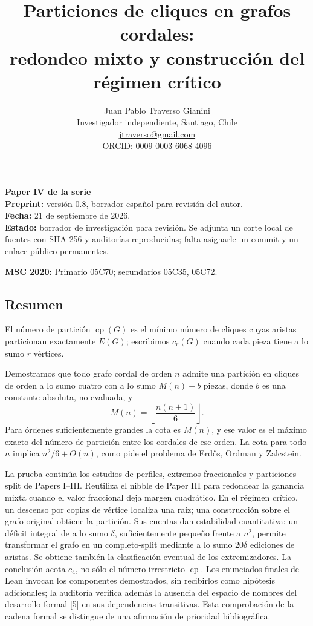 \documentclass[spanish,11pt,a4paper]{article}
\title{Particiones de cliques en grafos cordales:\\redondeo mixto y construcción del régimen crítico}
\author{Juan Pablo Traverso Gianini\\
\small Investigador independiente, Santiago, Chile\\
\small \href{mailto:jtraverso@gmail.com}{jtraverso@gmail.com}\\
\small ORCID: 0009-0003-6068-4096}
\date{}
\begin{document}
\raggedbottom
\maketitle
\textbf{Paper IV de la serie}\\
\textbf{Preprint:} versión 0.8, borrador español para revisión del autor.\\
\textbf{Fecha:} 21 de septiembre de 2026.\\
\textbf{Estado:} borrador de investigación para revisión. Se adjunta un corte local de fuentes con SHA-256 y auditorías reproducidas; falta asignarle un commit y un enlace público permanentes.

\textbf{MSC 2020:} Primario 05C70; secundarios 05C35, 05C72.

\subsection{Resumen}\label{resumen}

El número de partición \(\operatorname{cp}(G)\) es el mínimo número de cliques cuyas aristas particionan exactamente \(E(G)\); escribimos \(c_r(G)\) cuando cada pieza tiene a lo sumo \(r\) vértices.

Demostramos que todo grafo cordal de orden \(n\) admite una partición en cliques de orden a lo sumo cuatro con a lo sumo \(M(n)+b\) piezas, donde \(b\) es una constante absoluta, no evaluada, y \[
M(n)=\left\lfloor\frac{n(n+1)}6\right\rfloor.
\] Para órdenes suficientemente grandes la cota es \(M(n)\), y ese valor es el máximo exacto del número de partición entre los cordales de ese orden. La cota para todo \(n\) implica \(n^2/6+O(n)\), como pide el problema de Erdős, Ordman y Zalcstein.

La prueba continúa los estudios de perfiles, extremos fraccionales y particiones split de Papers I--III. Reutiliza el nibble de Paper III para redondear la ganancia mixta cuando el valor fraccional deja margen cuadrático. En el régimen crítico, un descenso por copias de vértice localiza una raíz; una construcción sobre el grafo original obtiene la partición. Sus cuentas dan estabilidad cuantitativa: un déficit integral de a lo sumo \(\delta\), suficientemente pequeño frente a \(n^2\), permite transformar el grafo en un completo-split mediante a lo sumo \(20\delta\) ediciones de aristas. Se obtiene también la clasificación eventual de los extremizadores. La conclusión acota \(c_4\), no sólo el número irrestricto \(\operatorname{cp}\). Los enunciados finales de Lean invocan los componentes demostrados, sin recibirlos como hipótesis adicionales; la auditoría verifica además la ausencia del espacio de nombres del desarrollo formal {[}5{]} en sus dependencias transitivas. Esta comprobación de la cadena formal se distingue de una afirmación de prioridad bibliográfica.
\end{document}
